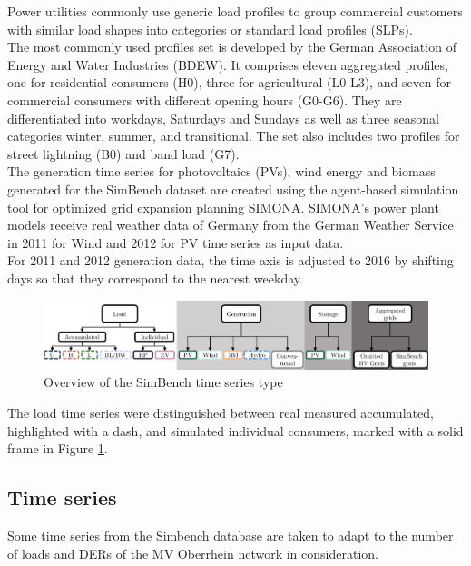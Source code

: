 Power utilities commonly use generic load profiles to group commercial customers with similar load shapes into categories or standard load profiles (\glspl{SLP}). \\
The most commonly used profiles set is developed by the German Association of Energy and Water Industries (\gls{BDEW}). It comprises eleven aggregated profiles, one for residential consumers (H0), three for agricultural (L0-L3), and seven for commercial consumers with different opening hours (G0-G6). They are differentiated into workdays, Saturdays and Sundays as well as three seasonal categories winter, summer, and transitional. The set also includes two profiles for street lightning (B0) and band load (G7). \\
The generation time series for photovoltaics (\glspl{PV}), wind energy and biomass generated for the SimBench dataset are created using the agent-based simulation tool for optimized grid expansion planning SIMONA. SIMONA's power plant models receive real weather data of Germany from the German Weather Service in 2011 for Wind and 2012 for \gls{PV} time series as input data. \\
For 2011 and 2012 generation data, the time axis is adjusted to 2016 by shifting days so that they correspond to the nearest weekday\cite{Simbenchds1}.\\

\begin{figure}[h]
\centering
    \includegraphics[width=.8\linewidth]{images/MVOberr/SimBench time series types.PNG}
\caption{Overview of the SimBench time series type}
\label{fig:SBtimeseriestype}
\end{figure}

The load time series were distinguished between real measured accumulated, highlighted with a dash, and simulated individual consumers, marked with a solid frame in Figure \ref{fig:SBtimeseriestype}. \\

\subsection{Time series}
\label{ts}
Some time series from the Simbench database are taken to adapt to the number of loads and \glspl{DER} of the MV Oberrhein network in consideration. \\

